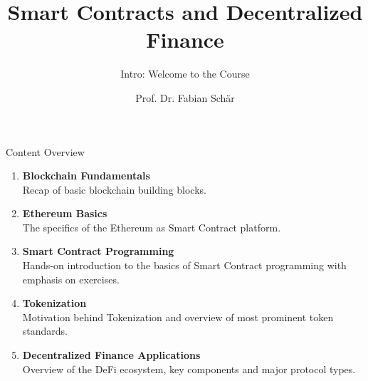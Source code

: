 \documentclass[]{beamer}
\title{Smart Contracts and Decentralized Finance}
\subtitle{Intro: Welcome to the Course}
\author{Prof. Dr. Fabian Schär}
\institute{University of Basel}
\begin{document}
\thispagestyle{empty}
\begin{frame}[noframenumbering]
	\titlepage
\end{frame}

\begin{frame}{Content Overview}

\begin{enumerate}
	\item<1-> \textbf{Blockchain Fundamentals}\\
		Recap of basic blockchain building blocks.
		\vspace{0.2em}
	\item<2-> \textbf{Ethereum Basics}\\
		The specifics of the Ethereum as Smart Contract platform.
		\vspace{0.2em}
	\item<3-> \textbf{Smart Contract Programming}\\
		Hands-on introduction to the basics of Smart Contract programming with emphasis on exercises.
		\vspace{0.2em}
	\item<4-> \textbf{Tokenization}\\
		Motivation behind Tokenization and overview of most prominent token standards.
		\vspace{0.2em}
	\item<5-> \textbf{Decentralized Finance Applications}\\
			Overview of the DeFi ecosystem, key components and major protocol types.
\end{enumerate}

\end{frame}
\end{document}
